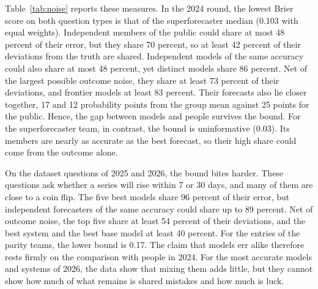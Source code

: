 \documentclass[11pt,a4paper]{article}
\theoremstyle{definition}
\begin{document}
Table~\ref{tab:noise} reports these measures. In the 2024 round, the lowest Brier score on both question types is that of the superforecaster median (0.103 with equal weights). Independent members of the public could share at most 48 percent of their error, but they share 70 percent, so at least 42 percent of their deviations from the truth are shared. Independent models of the same accuracy could also share at most 48 percent, yet distinct models share 86 percent. Net of the largest possible outcome noise, they share at least 73 percent of their deviations, and frontier models at least 83 percent. Their forecasts also lie closer together, 17 and 12 probability points from the group mean against 25 points for the public. Hence, the gap between models and people survives the bound. For the superforecaster team, in contrast, the bound is uninformative (0.03). Its members are nearly as accurate as the best forecast, so their high share could come from the outcome alone.

On the dataset questions of 2025 and 2026, the bound bites harder. These questions ask whether a series will rise within 7 or 30 days, and many of them are close to a coin flip. The five best models share 96 percent of their error, but independent forecasters of the same accuracy could share up to 89 percent. Net of outcome noise, the top five share at least 54 percent of their deviations, and the best system and the best base model at least 40 percent. For the entries of the parity teams, the lower bound is 0.17. The claim that models err alike therefore rests firmly on the comparison with people in 2024. For the most accurate models and systems of 2026, the data show that mixing them adds little, but they cannot show how much of what remains is shared mistakes and how much is luck.
\end{document}
